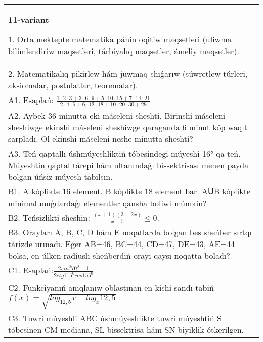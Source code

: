 \documentclass{article}
\begin{document}
\begin{tabular}{m{17cm}}
\textbf{11-variant}

1. Orta mektepte matematika pánin oqitiw maqsetleri (uliwma bilimlendiriw maqsetleri, tárbiyalıq maqsetler, ámeliy maqsetler). \\
2. Matematikalıq pikirlew hám juwmaq shıǵarıw (súwretlew túrleri, aksiomalar, postulatlar, teoremalar). \\
A1. Esaplań: \(\frac{1 \cdot 2 \cdot 3 + 3 \cdot 6 \cdot 9 + 5 \cdot 10 \cdot 15 + 7 \cdot 14 \cdot 21}{2 \cdot 4 \cdot 6 + 6 \cdot 12 \cdot 18 + 10 \cdot 20 \cdot 30 + 28}\) \\
A2. Aybek 36 minutta eki máseleni sheshti. Birinshi máseleni sheshiwge ekinshi máseleni sheshiwge qaraganda 6 minut kóp waqıt sarpladı. Ol ekinshi máseleni neshe minutta sheshti? \\
A3. Teń qaptallı úshmúyeshliktiń tóbesindegi múyeshi 16° qa teń. Múyeshtin qaptal tárepi hám ultanındaǵı bissektrisası menen payda bolgan úńsiz múyesh tabılsın. \\
B1. A kóplikte 16 element, B kóplikte 18 element bar. AՍB kóplikte minimal muģdardaģı elementler qansha boliwi múmkin? \\
B2. Teńsizlikti sheshin: \(\frac{ (x + 1) (3 - 2x) }{x - 5} \leq 0\). \\
B3. Orayları A, B, C, D hám E noqatlarda bolgan bes sheńber sırtqı tárizde urınadı. Eger AB=46, BC=44, CD=47, DE=43, AE=44 bolsa, en úlken radiuslı sheńberdiń orayı qaysı noqatta boladı? \\
C1. Esaplań:\(\frac{2sin^{2}70^{0} - 1}{2ctg115^{0}cos155^{0}}\) \\
C2. Funkciyanıń anıqlanıw oblastınan en kishi sandı tabiń \(f (x) = \sqrt{log_{12,5}x - log_{x}12,5}\) \\
C3. Tuwri múyeshli ABC úshmúyeshlikte tuwri múyeshtiń S tóbesinen CM mediana, SL bissektrisa hám SN biyiklik ótkerilgen. \\

\end{tabular}
\vspace{1cm}
\end{document}
